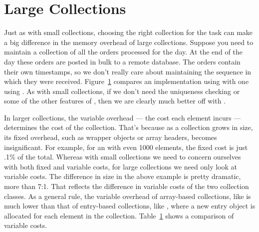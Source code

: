 





\section{Large Collections}

Just as with small collections, choosing the right collection for the task
can make a big difference in the memory overhead of large collections.  Suppose
you need to maintain a collection of all the orders processed for the day.  At
the end of the day these orders are posted in bulk to a remote database. The orders
contain their own timestamps, so we don't really care about maintaining the
sequence in which they were received. Figure~\ref{} compares an implementation
using  with one using . As with small
collections, if we don't need the uniqueness checking or some of the other features of , 
then we are clearly much better off with .

In larger collections, the variable overhead --- the cost each
element incurs --- determines the cost of the collection. That's because as a
collection grows in size, its fixed overhead, such as wrapper objects or array headers, becomes insignificant.  For
example, for an  with even 1000 elements, the fixed cost is
just .1\% of the total.  Whereas with small collections we need to concern
ourselves with both fixed and variable costs, for large collections we
need only look at variable costs. The difference in size in the above example
is pretty dramatic, more than 7:1. That reflects the difference in variable costs of the two collection classes. 
As a general rule, the variable overhead of array-based collections, like
 is much lower than that of entry-based collections, like , where a new entry
object is allocated for each element in the collection. Table~\ref{} shows a
comparison of variable costs.


